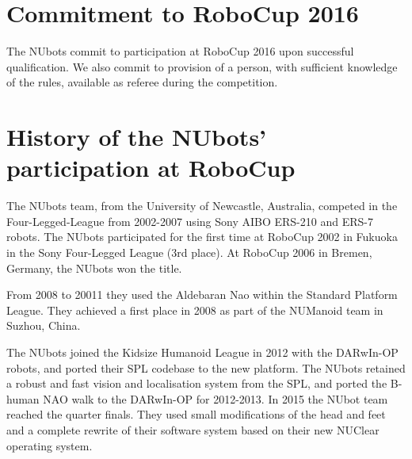\documentclass{llncs}
\begin{document}


\section{Commitment to RoboCup 2016}
The NUbots commit to participation at RoboCup 2016 upon successful qualification. We also commit to provision of a person, with sufficient knowledge of the rules, available as referee during the competition.

\section{History of the NUbots' participation at RoboCup}
The NUbots team, from the University of Newcastle, Australia, competed in the Four-Legged-League from 2002-2007 using Sony AIBO ERS-210 and ERS-7 robots. The NUbots participated for the first time at RoboCup 2002 in Fukuoka in the Sony Four-Legged League (3rd place). At RoboCup 2006 in Bremen, Germany, the NUbots won the title. %

From 2008 to 20011 they used the Aldebaran Nao within the Standard Platform League. They achieved a first place in 2008 as part of the NUManoid team in Suzhou, China.

The NUbots joined the Kidsize Humanoid League in 2012 with the DARwIn-OP robots, and ported their SPL codebase to the new platform. The NUbots retained a robust and fast vision and localisation system from the SPL, and ported the B-human NAO walk to the DARwIn-OP for 2012-2013. In 2015 the NUbot team reached the quarter finals. They used small modifications of the head and feet and a complete rewrite of their software system based on their new NUClear operating system.
\end{document}
